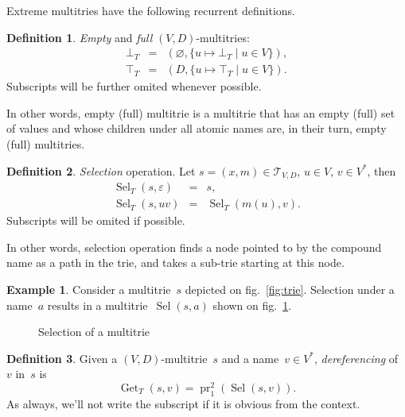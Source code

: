 \documentclass{article}
\theoremstyle{definition}
\newtheorem{Df}{Definition}
\newtheorem{Ex}{Example}
\newcommand{\setcharmt}{T}
\newcommand{\setsymbol}[3]{\mathcal{#1}_{#2,#3}}
\newcommand{\setmt}[2]{\setsymbol{\setcharmt}{#1}{#2}}
\newcommand{\select}{\operatorname{Sel}}
\newcommand{\deref}{\operatorname{Get}}
\newcommand{\proj}[2]{\operatorname{pr}^{#1}_{#2}}
\begin{document}
Extreme multitries have the following recurrent definitions.
\begin{Df}\label{df:mt-extreme}
\emph{Empty} and \emph{full} $(V,D)$-multitries:
\begin{eqnarray*}
  \bot_\setcharmt & = &
      ( \varnothing, \{ u \mapsto \bot_\setcharmt \mid u\in V \} ) , \\
  \top_\setcharmt & = &
      ( D,           \{ u \mapsto \top_\setcharmt \mid u\in V \} ) .
\end{eqnarray*}
Subscripts will be further omited whenever possible.
\end{Df}
In other words, empty (full) multitrie is a multitrie that has an empty
(full) set of values and whose children under all atomic names are, in their
turn, empty (full) multitries.

\begin{Df}\label{df:mt-select}
\emph{Selection} operation. Let $s=(x,m) \in \setmt{V}{D}$, $u\in V$,
$v\in V^\ast$, then
\begin{eqnarray*}
  \select_\setcharmt(s, \varepsilon) & = & s , \\
  \select_\setcharmt(s, u v) & = & \select_\setcharmt(m(u), v) .
\end{eqnarray*}
Subscripts will be omited if possible.
\end{Df}

In other words, selection operation finds a node pointed to by the
compound name as a path in the trie, and takes a sub-trie starting
at this node.

\begin{Ex}\label{ex:mt-select}
Consider a multitrie~$s$ depicted on fig.~\ref{fig:trie}. Selection under a
name~$a$ results in a multitrie~$\select(s,a)$ shown on
fig.~\ref{fig:mt-select}.
\end{Ex}

\begin{figure}[ht]
\begin{center}
\begin{minipage}{17em}
\end{minipage}
\end{center}
\caption{Selection of a multitrie}\label{fig:mt-select}
\end{figure}

\begin{Df}\label{df:mt-deref}
Given a $(V,D)$-multitrie~$s$ and a name~$v\in V^\ast$, \emph{dereferencing}
of~$v$ in~$s$ is
\[
  \deref_\setcharmt(s, v) = \proj{2}{1}(\select(s, v)) .
\]
As always, we'll not write the subscript if it is obvious from the context.
\end{Df}
\end{document}
